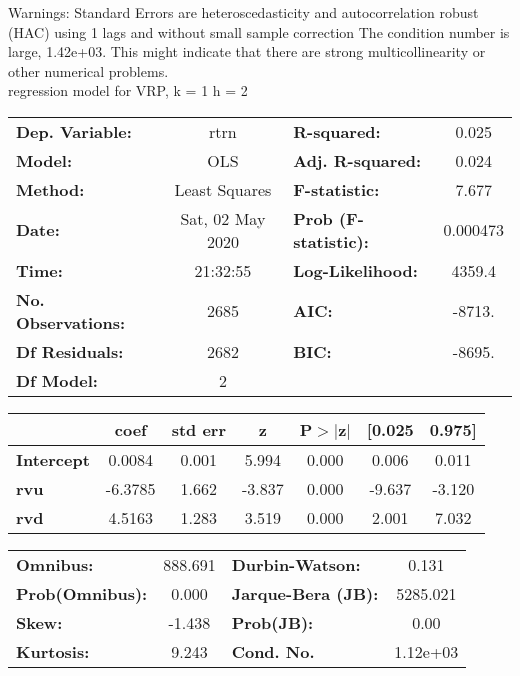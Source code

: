 Warnings: \newline
 [1] Standard Errors are heteroscedasticity and autocorrelation robust (HAC) using 1 lags and without small sample correction \newline
 [2] The condition number is large, 1.42e+03. This might indicate that there are \newline
 strong multicollinearity or other numerical problems.\\ 

regression model for VRP, k = 1 h = 2\begin{center}
\begin{tabular}{lclc}
\toprule
\textbf{Dep. Variable:}    &       rtrn       & \textbf{  R-squared:         } &     0.025   \\
\textbf{Model:}            &       OLS        & \textbf{  Adj. R-squared:    } &     0.024   \\
\textbf{Method:}           &  Least Squares   & \textbf{  F-statistic:       } &     7.677   \\
\textbf{Date:}             & Sat, 02 May 2020 & \textbf{  Prob (F-statistic):} &  0.000473   \\
\textbf{Time:}             &     21:32:55     & \textbf{  Log-Likelihood:    } &    4359.4   \\
\textbf{No. Observations:} &        2685      & \textbf{  AIC:               } &    -8713.   \\
\textbf{Df Residuals:}     &        2682      & \textbf{  BIC:               } &    -8695.   \\
\textbf{Df Model:}         &           2      & \textbf{                     } &             \\
\bottomrule
\end{tabular}
\begin{tabular}{lcccccc}
                   & \textbf{coef} & \textbf{std err} & \textbf{z} & \textbf{P$> |$z$|$} & \textbf{[0.025} & \textbf{0.975]}  \\
\midrule
\textbf{Intercept} &       0.0084  &        0.001     &     5.994  &         0.000        &        0.006    &        0.011     \\
\textbf{rvu}       &      -6.3785  &        1.662     &    -3.837  &         0.000        &       -9.637    &       -3.120     \\
\textbf{rvd}       &       4.5163  &        1.283     &     3.519  &         0.000        &        2.001    &        7.032     \\
\bottomrule
\end{tabular}
\begin{tabular}{lclc}
\textbf{Omnibus:}       & 888.691 & \textbf{  Durbin-Watson:     } &    0.131  \\
\textbf{Prob(Omnibus):} &   0.000 & \textbf{  Jarque-Bera (JB):  } & 5285.021  \\
\textbf{Skew:}          &  -1.438 & \textbf{  Prob(JB):          } &     0.00  \\
\textbf{Kurtosis:}      &   9.243 & \textbf{  Cond. No.          } & 1.12e+03  \\
\bottomrule
\end{tabular}
\end{center}

